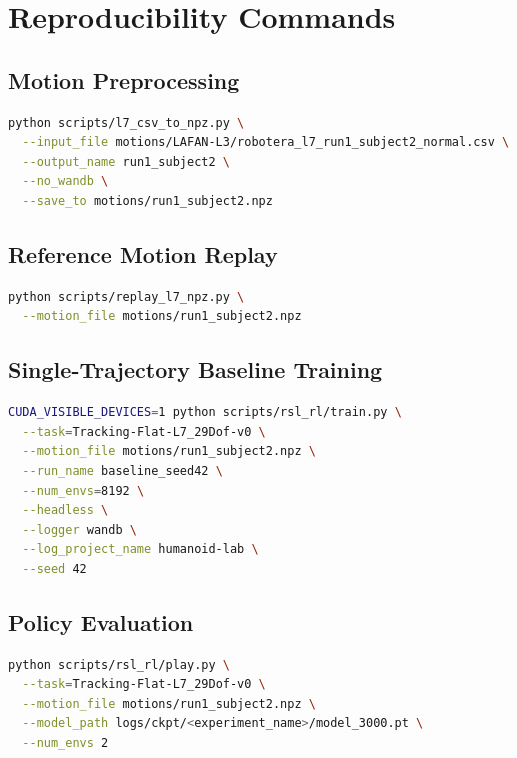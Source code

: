 \documentclass[UTF8]{ctexart}
\begin{document}
\section{Reproducibility Commands}

\subsection{Motion Preprocessing}

\begin{lstlisting}[language=bash]
python scripts/l7_csv_to_npz.py \
  --input_file motions/LAFAN-L3/robotera_l7_run1_subject2_normal.csv \
  --output_name run1_subject2 \
  --no_wandb \
  --save_to motions/run1_subject2.npz
\end{lstlisting}

\subsection{Reference Motion Replay}

\begin{lstlisting}[language=bash]
python scripts/replay_l7_npz.py \
  --motion_file motions/run1_subject2.npz
\end{lstlisting}

\subsection{Single-Trajectory Baseline Training}

\begin{lstlisting}[language=bash]
CUDA_VISIBLE_DEVICES=1 python scripts/rsl_rl/train.py \
  --task=Tracking-Flat-L7_29Dof-v0 \
  --motion_file motions/run1_subject2.npz \
  --run_name baseline_seed42 \
  --num_envs=8192 \
  --headless \
  --logger wandb \
  --log_project_name humanoid-lab \
  --seed 42
\end{lstlisting}

\subsection{Policy Evaluation}

\begin{lstlisting}[language=bash]
python scripts/rsl_rl/play.py \
  --task=Tracking-Flat-L7_29Dof-v0 \
  --motion_file motions/run1_subject2.npz \
  --model_path logs/ckpt/<experiment_name>/model_3000.pt \
  --num_envs 2
\end{lstlisting}
\end{document}
